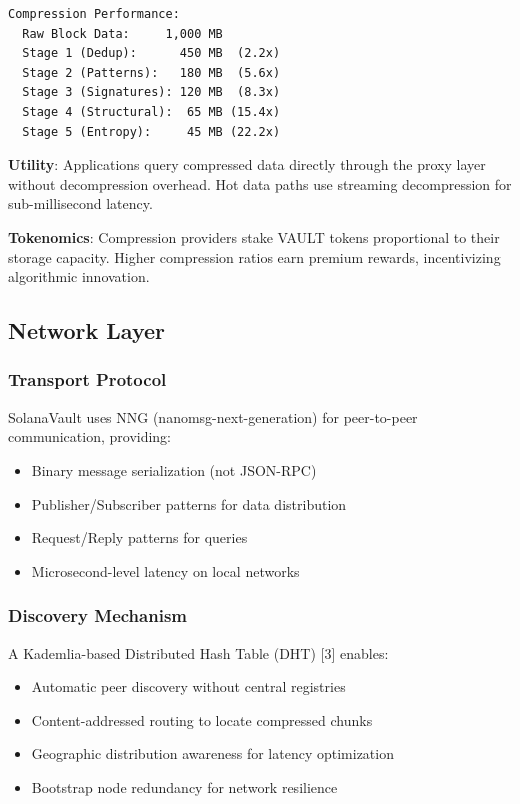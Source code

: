 \documentclass[12pt,a4paper]{article}
\begin{document}
\begin{verbatim}
Compression Performance:
  Raw Block Data:     1,000 MB
  Stage 1 (Dedup):      450 MB  (2.2x)
  Stage 2 (Patterns):   180 MB  (5.6x)
  Stage 3 (Signatures): 120 MB  (8.3x)
  Stage 4 (Structural):  65 MB (15.4x)
  Stage 5 (Entropy):     45 MB (22.2x)
\end{verbatim}

\noindent\textbf{Utility}: Applications query compressed data directly through the proxy layer without decompression overhead. Hot data paths use streaming decompression for sub-millisecond latency.

\noindent\textbf{Tokenomics}: Compression providers stake VAULT tokens proportional to their storage capacity. Higher compression ratios earn premium rewards, incentivizing algorithmic innovation.

\subsection{Network Layer}

\subsubsection{Transport Protocol}

SolanaVault uses NNG (nanomsg-next-generation) for peer-to-peer communication, providing:

\begin{itemize}
    \item Binary message serialization (not JSON-RPC)
    \item Publisher/Subscriber patterns for data distribution
    \item Request/Reply patterns for queries
    \item Microsecond-level latency on local networks
\end{itemize}

\subsubsection{Discovery Mechanism}

A Kademlia-based Distributed Hash Table (DHT) [3] enables:

\begin{itemize}
    \item Automatic peer discovery without central registries
    \item Content-addressed routing to locate compressed chunks
    \item Geographic distribution awareness for latency optimization
    \item Bootstrap node redundancy for network resilience
\end{itemize}
\end{document}
